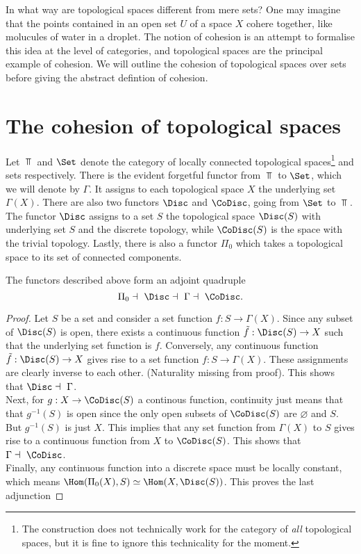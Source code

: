 In what way are topological spaces different from mere sets? One may imagine that the points contained in an open set $U$ of a space $X$ cohere together, like molucules of water in a droplet. The notion of cohesion is an attempt to formalise this idea at the level of categories, and topological spaces are the principal example of cohesion. We will outline the cohesion of topological spaces over sets before giving the abstract defintion of cohesion.\\

\section{The cohesion of topological spaces}
Let $\Top$ and $\Set$ denote the category of locally connected topological spaces\footnote{The construction does not technically work for the category of \textit{all} topological spaces, but it is fine to ignore this technicality for the moment.} and sets respectively. There is the evident forgetful functor from $\Top$ to $\Set$, which we will denote by $\Gamma$. It assigns to each topological space $X$ the underlying set $\Gamma(X)$. There are also two functors $\Disc$ and $\CoDisc$, going from $\Set$ to $\Top$. The functor $\Disc$ assigns to a set $S$ the topological space $\Disc(S)$ with underlying set $S$ and the discrete topology, while $\CoDisc(S)$ is the space with the trivial topology. Lastly, there is also a functor $\Pi_0$ which takes a topological space to its set of connected components.
\begin{proposition}
  The functors described above form an adjoint quadruple \[\Pi_0 \dashv\ \Disc \dashv\ \Gamma \dashv\ \CoDisc.\]
\end{proposition}
\begin{proof}
  Let $S$ be a set and consider a set function $f: S \to \Gamma(X)$. Since any subset of $\Disc(S)$ is open, there exists a continuous function $\tilde{f}: \Disc(S) \to X$ such that the underlying set function is $f$. Conversely, any continuous function $\tilde{f} : \Disc(S) \to X$ gives rise to a set function $ f: S \to \Gamma(X)$. These assignments are clearly inverse to each other. (Naturality missing from proof). This shows that $\Disc \dashv\ \Gamma$.\\
  Next, for $g: X \to \CoDisc(S)$ a continous function, continuity just means that that $g^{-1}(S)$ is open since the only open subsets of $\CoDisc(S)$ are $\varnothing$ and $S$.
  But $g^{-1}(S)$ is just $X$. This implies that any set function from $\Gamma(X)$ to $S$ gives rise to a continuous function from $X$ to $\CoDisc(S)$. This shows that $\Gamma \dashv\ \CoDisc$.\\
  Finally, any continuous function into a discrete space must be locally constant, which means $\Hom(\Pi_0(X), S) \simeq \Hom(X, \Disc(S))$. This proves the last adjunction
\end{proof}

